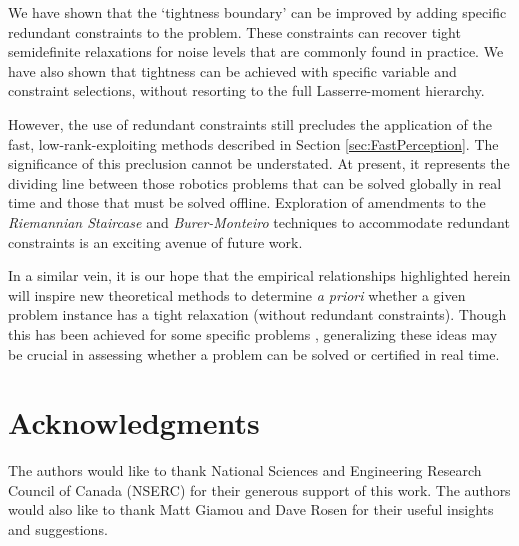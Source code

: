 \documentclass[lettersize,journal]{IEEEtran}
\newcommand{\rev}[1]{\color{red}{#1}\color{black}}
\begin{document}
We have shown that the `tightness boundary' can be improved by adding specific redundant constraints to the problem. These constraints can recover tight semidefinite relaxations for noise levels that are commonly found in practice. We have also shown that tightness can be achieved with specific variable and constraint selections, without resorting to the full Lasserre-moment hierarchy. 

However, the use of redundant constraints still precludes the application of the fast, low-rank-exploiting methods described in Section \ref{sec:FastPerception}. The significance of this preclusion cannot be understated. At present, it represents the dividing line between those robotics problems that can be solved globally in real time and those that must be solved offline. Exploration of amendments to the \emph{Riemannian Staircase} and \emph{Burer-Monteiro} techniques to accommodate redundant constraints is an exciting avenue of future work. 

In a similar vein, it is our hope that the empirical relationships highlighted herein will inspire new theoretical methods to determine \emph{a priori} whether a given \rev{QCQP} problem instance has a tight relaxation (without redundant constraints)\cite{carloneEstimationContractsOutlierRobust2022}. Though this has been achieved for some specific problems \cite{brynteTightnessSemidefiniteRelaxations2022,iglesiasGlobalOptimalityPoint2020,erikssonRotationAveragingStrong2018}, generalizing these ideas may be crucial in assessing whether a problem can be solved or certified in real time. 

\section{Acknowledgments}

The authors would like to thank National Sciences and Engineering Research Council of Canada (NSERC) for their generous support of this work. The authors would also like to thank Matt Giamou and Dave Rosen for their useful insights and suggestions.
 


\end{document}
